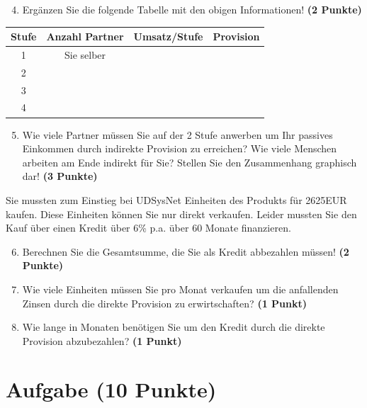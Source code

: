 \documentclass[a4paper, 9pt]{scrartcl}\usepackage[]{graphicx}\usepackage[]{xcolor}
\begin{document}
\begin{enumerate}
  \setcounter{enumi}{3}
\item Erg{\"a}nzen Sie die folgende Tabelle mit den obigen Informationen! \textbf{(2 Punkte)}
\end{enumerate}

\begin{center}
\begin{tabular}{c|c|c|c}
  \toprule
  \textbf{Stufe} & \textbf{Anzahl Partner}  & \textbf{Umsatz/Stufe} & \textbf{Provision}\\
  \midrule
  1 & Sie selber  &  & \\ \midrule
  2 &   &  &  \\ \midrule
  3 &   &  &  \\ \midrule
  4 &   &  &  \\
  \bottomrule
\end{tabular}
\end{center}

\begin{enumerate}
  \setcounter{enumi}{4}
\item Wie viele Partner m{\"u}ssen Sie auf der 2 Stufe anwerben um Ihr passives
  Einkommen durch indirekte Provision zu erreichen? Wie viele Menschen
  arbeiten am Ende indirekt f{\"u}r Sie? Stellen Sie den
  Zusammenhang graphisch dar!  \textbf{(3 Punkte)}
\end{enumerate}

Sie mussten zum Einstieg bei UDSysNet Einheiten des Produkts
f{\"u}r 2625EUR kaufen. Diese Einheiten k{\"o}nnen Sie nur direkt
verkaufen. Leider mussten Sie den Kauf {\"u}ber einen Kredit {\"u}ber
6\% p.a. {\"u}ber 60 Monate finanzieren.

\begin{enumerate}
  \setcounter{enumi}{5}
\item Berechnen Sie die Gesamtsumme, die Sie als Kredit abbezahlen m{\"u}ssen! \textbf{(2 Punkte)}
\item Wie viele Einheiten m{\"u}ssen Sie pro Monat verkaufen um die anfallenden Zinsen
  durch die direkte Provision zu erwirtschaften? \textbf{(1 Punkt)}
\item Wie lange in
  Monaten ben{\"o}tigen Sie um den Kredit durch die direkte
  Provision abzubezahlen? \textbf{(1 Punkt)}
\end{enumerate} 
\clearpage

\section{Aufgabe \hfill (10 Punkte)}
\end{document}
